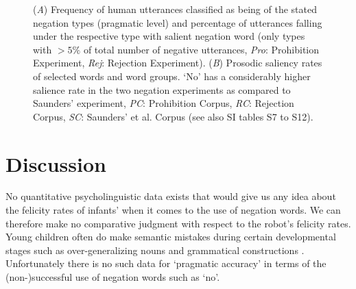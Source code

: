 \NewCoffin \FIGTHREE
\NewCoffin \ATCap
\NewCoffin \AT
\NewCoffin \BTCap
\NewCoffin \BT
\NewCoffin \ABTCap
\SetHorizontalCoffin \FIGTHREE{}
\begin{figure*}\SetHorizontalCoffin {}
  \JoinCoffins\FIGTHREE[vc,hc]\ATCap[vc,hc]
\SetHorizontalCoffin {}
\JoinCoffins{}\AT[t,l]
\SetHorizontalCoffin \ABTCap {
  \begin{minipage}[t][0.7cm][c]{\textwidth}
\end{minipage}
}
\JoinCoffins \FIGTHREE[\AT-b,\AT-l]\ABTCap[t,l]
\SetHorizontalCoffin {}
\JoinCoffins{}\BTCap[t,r]
\SetHorizontalCoffin {}
\JoinCoffins {}\BT[t,l]
\TypesetCoffin\FIGTHREE
\caption{(\emph{A}) Frequency of human utterances classified as being of the stated negation types (pragmatic level) and percentage of utterances falling under
  the respective type with salient negation word (only types with $> 5\%$ of total number of negative utterances, \emph{Pro}: Prohibition Experiment, \emph{Rej}:
  Rejection Experiment). (\emph{B}) Prosodic saliency rates of selected words and word groups. `No' has a considerably higher salience rate in the two negation
  experiments as compared to Saunders' experiment, \emph{PC}: Prohibition Corpus, \emph{RC}: Rejection Corpus, \emph{SC}: Saunders' et al. Corpus (see also
  SI tables S7 to S12).}
\label{fig_salience}
\end{figure*}

\section{Discussion}

No quantitative psycholinguistic data exists that would give us any idea about the felicity rates of infants' when it comes to the use of negation words.
We can therefore make no comparative judgment with respect to the robot's felicity rates. Young children often do make semantic mistakes during certain developmental
stages such as over-generalizing nouns \cite{Gelman1998} and grammatical constructions \cite{Bowerman1988,Brooks1999}. Unfortunately there is no such data for `pragmatic
accuracy' in terms of the (non-)successful use of negation words such as `no'.\\


